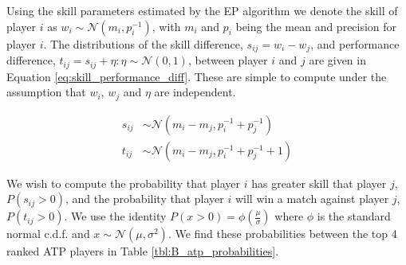 \documentclass[11pt]{article}
\begin{document}
Using the skill parameters estimated by the EP algorithm we denote the skill of player $i$ as $w_i \sim \mathcal{N}(m_i, p_i^{-1})$, with $m_i$ and $p_i$ being the mean and precision for player $i$. The distributions of the skill difference, $s_{ij} = w_i - w_j$, and performance difference, $t_{ij} = s_{ij} + \eta : \eta \sim \mathcal{N}(0, 1)$, between player $i$ and $j$ are given in Equation \ref{eq:skill_performance_diff}. These are simple to compute under the assumption that $w_i$, $w_j$ and $\eta$ are independent.

\begin{equation}
\begin{split}
    s_{ij} &\sim \mathcal{N}(m_i - m_j, p_i^{-1} + p_j^{-1}) \\
    t_{ij} &\sim \mathcal{N}(m_i - m_j, p_i^{-1} + p_j^{-1} + 1)
\end{split}
\label{eq:skill_performance_diff}
\end{equation}

We wish to compute the probability that player $i$ has greater skill that player $j$, $P(s_{ij}>0)$, and the probability that player $i$ will win a match against player $j$, $P(t_{ij}>0)$. We use the identity $P(x>0) = \phi(\frac{\mu}{\sigma})$ where $\phi$ is the standard normal c.d.f. and $x \sim \mathcal{N}(\mu, \sigma^2)$. We find these probabilities between the top 4 ranked ATP players in Table \ref{tbl:B_atp_probabilities}.
\end{document}
